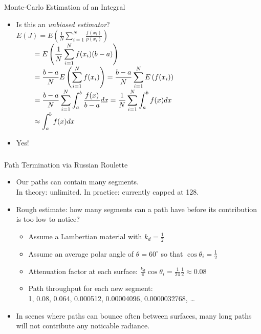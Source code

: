 \documentclass[utf8,stillsansserifmath,fleqn,t]{beamer}
\newcommand{\ds}{\displaystyle}
\begin{document}
\begin{frame}
\frametitle{\insertsection}
Monte-Carlo Estimation of an Integral
\begin{itemize}
\item Is this an \emph{unbiased estimator}?\\
      $\ds E(J)            = E\left(\frac{1}{N}\sum_{i=1}^{N}\frac{f(x_i)}{p(x_i)}\right)$\\
      $\ds \hphantom{E(J)} = E\left(\frac{1}{N}\sum_{i=1}^{N}f(x_i)(b-a)\right)$\\
      $\ds \hphantom{E(J)} = \frac{b-a}{N} E\left(\sum_{i=1}^{N}f(x_i)\right) =
                             \frac{b-a}{N} \sum_{i=1}^{N} E\left(f(x_i)\right)$\\
      $\ds \hphantom{E(J)} = \frac{b-a}{N} \sum_{i=1}^{N} \int_a^b\frac{f(x)}{b-a}dx = 
                             \frac{1}{N} \sum_{i=1}^{N} \int_a^b f(x)dx$\\
      $\ds \hphantom{E(J)} \approx \int_a^b f(x)dx$
\item Yes!
\end{itemize}
\end{frame}

\begin{frame}[label=rr-1]
\frametitle{\insertsection}
Path Termination via Russian Roulette
\begin{itemize}
\item Our paths can contain many segments.\\
    In theory: unlimited. In practice: currently capped at 128.
\item Rough estimate: how many segments can a path have before its contribution is too low to notice?
    \begin{itemize}
    \item Assume a Lambertian material with $k_d = \frac{1}{2}$
    \item Assume an average polar angle of $\theta=60^{\circ}$ so that $\cos\theta_i=\frac{1}{2}$
    \item Attenuation factor at each surface: $\ds \frac{k_d}{\pi} \cos\theta_i = \frac{1}{2\pi}\frac{1}{2} \approx 0.08$
    \item Path throughput for each new segment:\\
    1, 0.08, 0.064, 0.000512, 0.00004096, 0.0000032768, \ldots{}
    \end{itemize}
\item In scenes where paths can bounce often between surfaces, many long paths will not contribute
any noticable radiance.
\end{itemize}
\end{frame}
\end{document}
